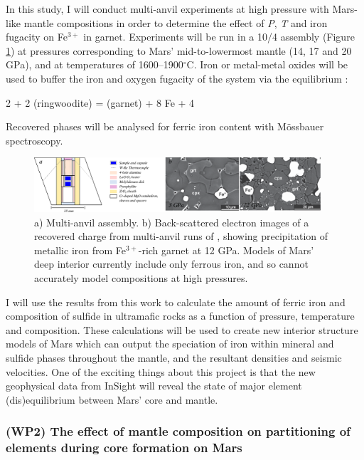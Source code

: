 \documentclass[11pt,twoside,a4paper]{article}
\begin{document}
In this study, I will conduct multi-anvil experiments at high pressure with Mars-like mantle compositions in order to determine the effect of \emph{P}, \emph{T} and iron fugacity on Fe$^{3+}$ in garnet. Experiments will be run in a 10/4 assembly (Figure \ref{fig:iron_expts}) at pressures corresponding to Mars' mid-to-lowermost mantle (14, 17 and 20 GPa), and at temperatures of 1600--1900$^{\circ}$C. Iron or metal-metal oxides will be used to buffer the iron and oxygen fugacity of the system via the equilibrium \citep{SOMF2013}:
\begin{reaction}
 2  + 2 (ringwoodite) =  (garnet) + 8 Fe + 4 
\end{reaction}
Recovered phases will be analysed for ferric iron content with M\"{o}ssbauer spectroscopy. 

\begin{figure}[!ht]
  \centering
  \includegraphics[width=0.95\textwidth]{figures/autoredox}
  \caption{a) Multi-anvil assembly. b) Back-scattered electron images of a recovered charge from multi-anvil runs of \cite{Rohrbachetal2007}, showing precipitation of metallic iron from Fe$^{3+}$-rich garnet at 12 GPa. Models of Mars' deep interior currently include only ferrous iron, and so cannot accurately model compositions at high pressures.}
  \label{fig:iron_expts}
\end{figure}

I will use the results from this work to calculate the amount of ferric iron and composition of sulfide in ultramafic rocks as a function of pressure, temperature and composition. These calculations will be used to create new interior structure models of Mars which can output the speciation of iron within mineral and sulfide phases throughout the mantle, and the resultant densities and seismic velocities. One of the exciting things about this project is that the new geophysical data from InSight will reveal the state of major element (dis)equilibrium between Mars' core and mantle.

\subsubsection*{(WP2) The effect of mantle composition on partitioning of elements during core formation on Mars}
\end{document}
